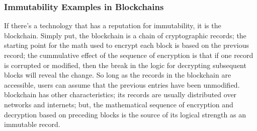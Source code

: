 \subsubsection{Immutability Examples in Blockchains}
If there's a technology that has a reputation for immutability, it is the \gls{blockchain}.  Simply put, the \gls{blockchain} is a chain of cryptographic records; the starting point for the math used to \gls{encrypt} each block is based on the previous record; the cummulative effect of the sequence of encryption is that if one record is corrupted or modified, then the break in the logic for decrypting subsequent blocks will reveal the change.  So long as the records in the \gls{blockchain} are accessible, users can assume that the previous entries have been unmodified.  \Gls{blockchain} has other characteristics; its records are usually distributed over networks and internets; but, the mathematical sequence of encryption and \gls{decryption} based on preceding blocks is the source of its logical strength as an immutable record.

